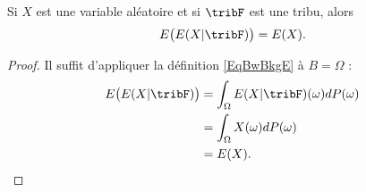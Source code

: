 \begin{corollary}   \label{CorakyvMp}
    Si \( X\) est une variable aléatoire et si \( \tribF\) est une tribu, alors
    \begin{equation}
        E\big( E(X|\tribF) \big)=E(X).
    \end{equation}
\end{corollary}

\begin{proof}
    Il suffit d'appliquer la définition \eqref{EqBwBkgE} à \( B=\Omega\) :
    \begin{subequations}
        \begin{align}
            E\big( E(X|\tribF) \big)&=\int_{\Omega}E(X|\tribF)(\omega)dP(\omega)\\
            &=\int_{\Omega}X(\omega)dP(\omega)\\
            &=E(X).
        \end{align}
    \end{subequations}
\end{proof}

